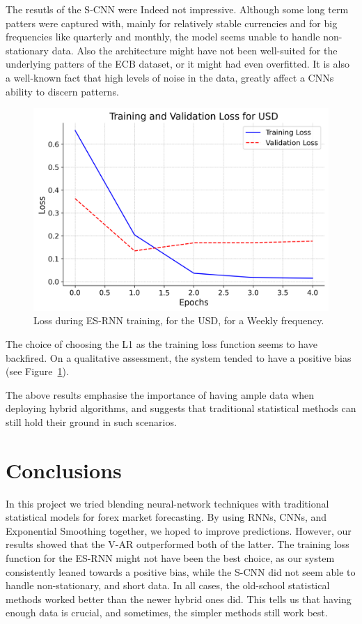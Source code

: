 \documentclass[conference]{IEEEtran}
\begin{document}
The resutls of the S-CNN were Indeed not impressive. Although some long term patters were captured with, mainly for relatively stable currencies and for big frequencies like quarterly and monthly, the model seems unable to handle non-stationary data. Also the architecture might have not been well-suited for the underlying patters of the ECB dataset, or it might had even overfitted. It is also a well-known fact that high levels of noise in the data, greatly affect a CNNs ability to discern patterns.

\begin{figure}[htbp]
\centerline{\includegraphics[width=\linewidth]{USD_loss_plot.png}}
\caption{Loss during ES-RNN training, for the USD, for a Weekly frequency.}
\label{fig:loss}
\end{figure}

The choice of choosing the L1 as the training loss function seems to have backfired. On a qualitative assessment, the system tended to have a positive bias (see Figure~\ref{fig:loss}). 

The above results emphasise the importance of having ample data when deploying hybrid algorithms, and suggests that traditional statistical methods can still hold their ground in such scenarios.

\section{Conclusions}

In this project we tried blending neural-network techniques with traditional statistical models for forex market forecasting. By using RNNs, CNNs, and Exponential Smoothing together, we hoped to improve predictions. However, our results showed that the V-AR outperformed both of the latter. The training loss function for the ES-RNN might not have been the best choice, as our system consistently leaned towards a positive bias, while the S-CNN did not seem able to handle non-stationary, and short data. In all cases, the old-school statistical methods worked better than the newer hybrid ones did. This tells us that having enough data is crucial, and sometimes, the simpler methods still work best.
\end{document}
